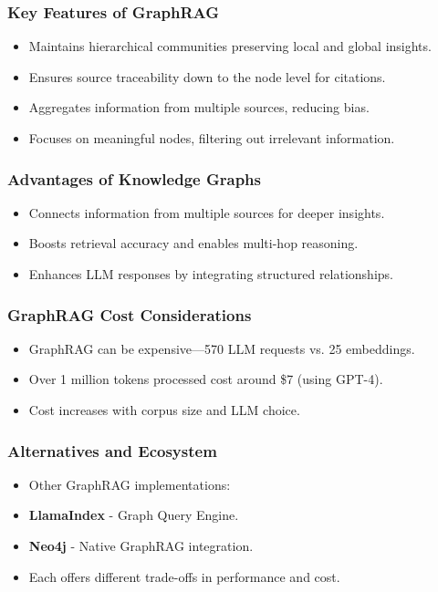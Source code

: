 \begin{frame}[fragile]\frametitle{Key Features of GraphRAG}
    \begin{itemize}
        \item Maintains hierarchical communities preserving local and global insights.
        \item Ensures source traceability down to the node level for citations.
        \item Aggregates information from multiple sources, reducing bias.
        \item Focuses on meaningful nodes, filtering out irrelevant information.
    \end{itemize}
\end{frame}

\begin{frame}[fragile]\frametitle{Advantages of Knowledge Graphs}
    \begin{itemize}
        \item Connects information from multiple sources for deeper insights.
        \item Boosts retrieval accuracy and enables multi-hop reasoning.
        \item Enhances LLM responses by integrating structured relationships.
    \end{itemize}
\end{frame}

\begin{frame}[fragile]\frametitle{GraphRAG Cost Considerations}
  \begin{itemize}
    \item GraphRAG can be expensive—570 LLM requests vs. 25 embeddings.
    \item Over 1 million tokens processed cost around \$7 (using GPT-4).
    \item Cost increases with corpus size and LLM choice.
  \end{itemize}
\end{frame}

\begin{frame}[fragile]\frametitle{Alternatives and Ecosystem}
  \begin{itemize}
    \item Other GraphRAG implementations:
    \item \textbf{LlamaIndex} - Graph Query Engine.
    \item \textbf{Neo4j} - Native GraphRAG integration.
    \item Each offers different trade-offs in performance and cost.
  \end{itemize}
\end{frame}

